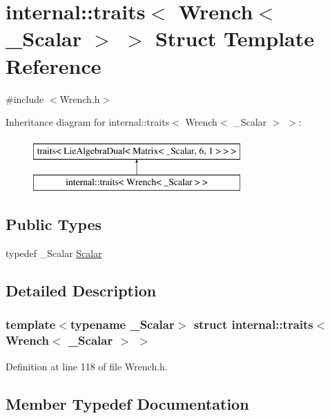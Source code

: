 \hypertarget{structinternal_1_1traits_3_01_wrench_3_01___scalar_01_4_01_4}{}\section{internal\+:\+:traits$<$ Wrench$<$ \+\_\+\+Scalar $>$ $>$ Struct Template Reference}
\label{structinternal_1_1traits_3_01_wrench_3_01___scalar_01_4_01_4}


{\ttfamily \#include $<$Wrench.\+h$>$}

Inheritance diagram for internal\+:\+:traits$<$ Wrench$<$ \+\_\+\+Scalar $>$ $>$\+:\begin{figure}[H]
\begin{center}
\leavevmode
\includegraphics[height=2.000000cm]{structinternal_1_1traits_3_01_wrench_3_01___scalar_01_4_01_4}
\end{center}
\end{figure}
\subsection*{Public Types}
\begin{DoxyCompactItemize}
\item 
typedef \+\_\+\+Scalar \hyperlink{structinternal_1_1traits_3_01_wrench_3_01___scalar_01_4_01_4_ad1e23cc3d2be914db89e28e5c26b87e1}{Scalar}
\end{DoxyCompactItemize}


\subsection{Detailed Description}
\subsubsection*{template$<$typename \+\_\+\+Scalar$>$\newline
struct internal\+::traits$<$ Wrench$<$ \+\_\+\+Scalar $>$ $>$}



Definition at line 118 of file Wrench.\+h.



\subsection{Member Typedef Documentation}
\hypertarget{structinternal_1_1traits_3_01_wrench_3_01___scalar_01_4_01_4_ad1e23cc3d2be914db89e28e5c26b87e1}{}\label{structinternal_1_1traits_3_01_wrench_3_01___scalar_01_4_01_4_ad1e23cc3d2be914db89e28e5c26b87e1} 
